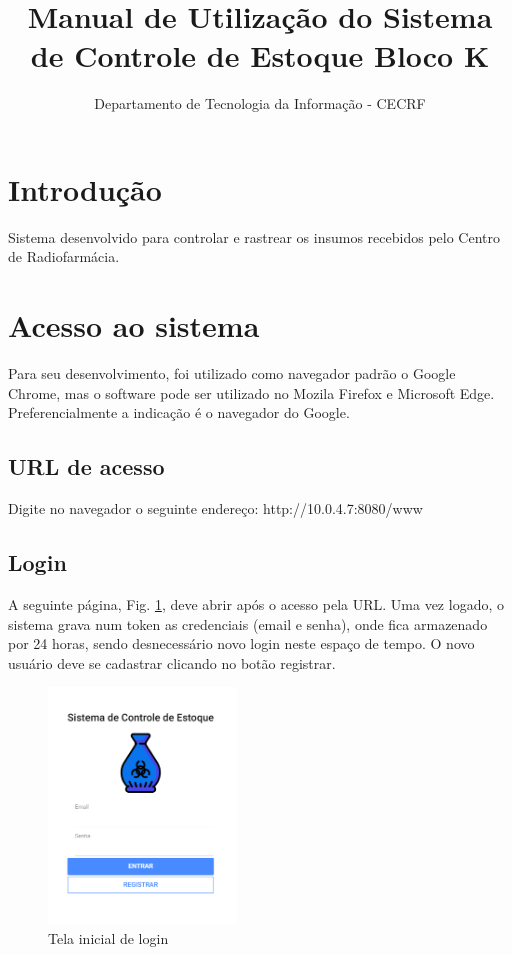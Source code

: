 \documentclass[letterpaper, 12 pt]{article}
\begin{document}
\title{Manual de Utilização do Sistema de Controle de Estoque Bloco K}
\author{Departamento de Tecnologia da Informação - CECRF}
\maketitle
\pagestyle{empty}
\newpage


\tableofcontents
\newpage

\section{Introdução}
Sistema desenvolvido para controlar e rastrear os insumos recebidos pelo Centro de Radiofarmácia.
\newpage


\section{Acesso ao sistema}
Para seu desenvolvimento, foi utilizado como navegador padrão o Google Chrome, mas o software pode ser utilizado 
no Mozila Firefox e Microsoft Edge. Preferencialmente a indicação é o navegador do Google.
\subsection{URL de acesso}
Digite no navegador o seguinte endereço: http://10.0.4.7:8080/www
\subsection{Login}
A seguinte página, Fig. \ref{figura:login1}, deve abrir após o acesso pela URL. Uma vez logado, o sistema grava num token as credenciais (email e senha), onde fica armazenado por 24 horas, sendo desnecessário novo login neste espaço de tempo.
O novo usuário deve se cadastrar clicando no botão registrar.  

\begin{figure}[h]
\centering %
\includegraphics[width=5cm]{imagens/login1.PNG}
\caption{Tela inicial de login}
\label{figura:login1}
\end{figure}
\newpage
\end{document}
